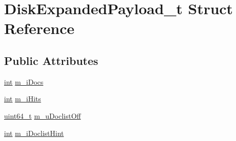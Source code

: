 \hypertarget{structDiskExpandedPayload__t}{\section{Disk\-Expanded\-Payload\-\_\-t Struct Reference}
\label{structDiskExpandedPayload__t}
}
\subsection*{Public Attributes}
\begin{DoxyCompactItemize}
\item 
\hyperlink{sphinxexpr_8cpp_a4a26e8f9cb8b736e0c4cbf4d16de985e}{int} \hyperlink{structDiskExpandedPayload__t_a0102dbbed9371fc53c23d850f9ae3957}{m\-\_\-i\-Docs}
\item 
\hyperlink{sphinxexpr_8cpp_a4a26e8f9cb8b736e0c4cbf4d16de985e}{int} \hyperlink{structDiskExpandedPayload__t_a78a59a0901f9489a71e40d4588ed3517}{m\-\_\-i\-Hits}
\item 
\hyperlink{sphinxstd_8h_aaa5d1cd013383c889537491c3cfd9aad}{uint64\-\_\-t} \hyperlink{structDiskExpandedPayload__t_ad7ddcb299a75056788060f88894f281d}{m\-\_\-u\-Doclist\-Off}
\item 
\hyperlink{sphinxexpr_8cpp_a4a26e8f9cb8b736e0c4cbf4d16de985e}{int} \hyperlink{structDiskExpandedPayload__t_a092c94197110128c4993176d7826a5fd}{m\-\_\-i\-Doclist\-Hint}
\end{DoxyCompactItemize}


